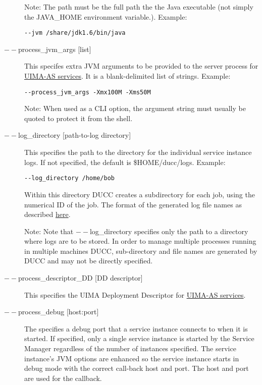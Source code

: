 \begin{description}
          Note: The path must be the full path the the Java executable (not 
          simply the JAVA\_HOME environment variable.).  Example:
\begin{verbatim}
--jvm /share/jdk1.6/bin/java 
\end{verbatim}


        \item[$--$process\_jvm\_args {[list]} ]        
          This specifes extra JVM arguments to be provided to the server process for
          \hyperref[sec:services.types]{UIMA-AS services}. It is a blank-delimited 
            list of strings. Example: 
\begin{verbatim}
--process_jvm_args -Xmx100M -Xms50M
\end{verbatim}

          Note: When used as a CLI option, the argument string must usually be quoted to protect
          it from the shell.
    
          \item[$--$log\_directory {[path-to-log directory]}] This specifies the path to the directory for
            the individual service instance logs. If not specified, the default is \$HOME/ducc/logs. Example:
\begin{verbatim}
--log_directory /home/bob 
\end{verbatim}
        
        Within this directory DUCC creates a subdirectory for each job, using the numerical 
        ID of the job. The format of the generated log file names as described
        \hyperref[chap:job-logs]{here}.
        
        Note: Note that $--$log\_directory specifies only the path to a directory where 
        logs are to be stored. In order to manage multiple processes running in multiple 
        machines DUCC, sub-directory and file names are generated by DUCC and may 
        not be directly specified. 

      \item[$--$process\_descriptor\_DD {[DD descriptor]}] 
        This specifies the UIMA Deployment Descriptor for \hyperref[sec:services.types]{UIMA-AS services}.

      \item[$--$process\_debug {[host:port]}]        
        The specifies a debug port that a service instance connects to when it is started.  If specified,
        only a single service instance is started by the Service Manager regardless of the number of
        instances specified.  The service instance's JVM options are enhanced so the service instance
        starts in debug mode with the correct call-back host and port.  The host and port are used
        for the callback.


\end{description}
